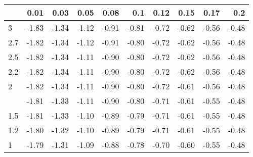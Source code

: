 
\begin{tabular}{lrrrrrrrrr}
\toprule
  & 0.01 & 0.03 & 0.05 & 0.08 & 0.1 & 0.12 & 0.15 & 0.17 & 0.2\\
\midrule
3 & -1.83 & -1.34 & -1.12 & -0.91 & -0.81 & -0.72 & -0.62 & -0.56 & -0.48\\
2.7 & -1.82 & -1.34 & -1.12 & -0.91 & -0.80 & -0.72 & -0.62 & -0.56 & -0.48\\
2.5 & -1.82 & -1.34 & -1.11 & -0.90 & -0.80 & -0.72 & -0.62 & -0.56 & -0.48\\
2.2 & -1.82 & -1.34 & -1.11 & -0.90 & -0.80 & -0.72 & -0.62 & -0.56 & -0.48\\
2 & -1.82 & -1.34 & -1.11 & -0.90 & -0.80 & -0.72 & -0.61 & -0.56 & -0.48\\
\addlinespace
1.7 & -1.81 & -1.33 & -1.11 & -0.90 & -0.80 & -0.71 & -0.61 & -0.55 & -0.48\\
1.5 & -1.81 & -1.33 & -1.10 & -0.89 & -0.79 & -0.71 & -0.61 & -0.55 & -0.48\\
1.2 & -1.80 & -1.32 & -1.10 & -0.89 & -0.79 & -0.71 & -0.61 & -0.55 & -0.48\\
1 & -1.79 & -1.31 & -1.09 & -0.88 & -0.78 & -0.70 & -0.60 & -0.55 & -0.48\\
\bottomrule
\end{tabular}
